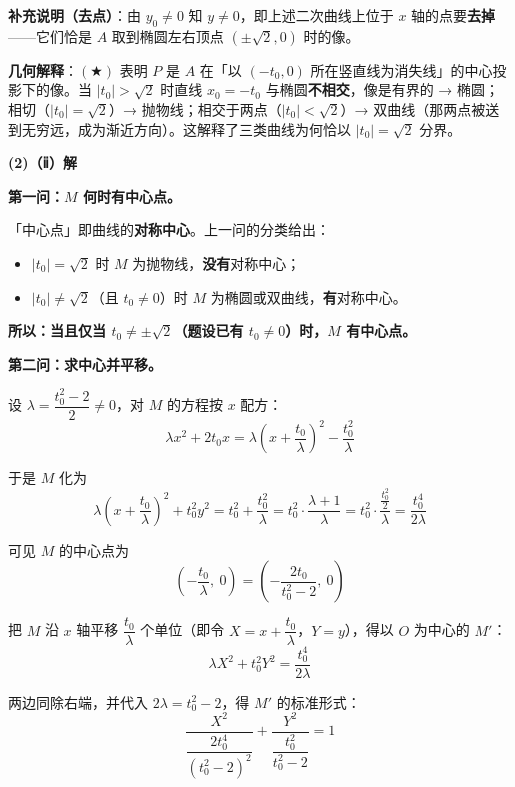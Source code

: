 \begin{answer}
\textbf{补充说明（去点）}：由 $y_0\ne0$ 知 $y\ne0$，即上述二次曲线上位于 $x$ 轴的点要\textbf{去掉}——它们恰是 $A$ 取到椭圆左右顶点 $\left(\pm\sqrt2,0\right)$ 时的像。

\begin{gktip}
\textbf{几何解释}：$(\bigstar)$ 表明 $P$ 是 $A$ 在「以 $\left(-t_0,0\right)$ 所在竖直线为消失线」的中心投影下的像。当 $\left|t_0\right|>\sqrt2$ 时直线 $x_0=-t_0$ 与椭圆\textbf{不相交}，像是有界的 → 椭圆；相切（$\left|t_0\right|=\sqrt2$）→ 抛物线；相交于两点（$\left|t_0\right|<\sqrt2$）→ 双曲线（那两点被送到无穷远，成为渐近方向）。这解释了三类曲线为何恰以 $\left|t_0\right|=\sqrt2$ 分界。
\end{gktip}

\par\medskip

\textbf{(2)（ⅱ）解}

\textbf{第一问：$M$ 何时有中心点。}

「中心点」即曲线的\textbf{对称中心}。上一问的分类给出：
\begin{itemize}
\item $\left|t_0\right|=\sqrt2$ 时 $M$ 为抛物线，\textbf{没有}对称中心；
\item $\left|t_0\right|\ne\sqrt2$（且 $t_0\ne0$）时 $M$ 为椭圆或双曲线，\textbf{有}对称中心。
\end{itemize}

\textbf{所以：当且仅当 $t_0\ne\pm\sqrt2$（题设已有 $t_0\ne0$）时，$M$ 有中心点。}

\textbf{第二问：求中心并平移。}

设 $\lambda=\dfrac{t_0^2-2}{2}\ne0$，对 $M$ 的方程按 $x$ 配方：
\nopagebreak[4]
\[\lambda x^2+2t_0x=\lambda\left(x+\frac{t_0}{\lambda}\right)^2-\frac{t_0^2}{\lambda}\]

于是 $M$ 化为
\nopagebreak[4]
\[\lambda\left(x+\frac{t_0}{\lambda}\right)^2+t_0^2y^2=t_0^2+\frac{t_0^2}{\lambda}=t_0^2\cdot\frac{\lambda+1}{\lambda}=t_0^2\cdot\frac{\frac{t_0^2}{2}}{\lambda}=\frac{t_0^4}{2\lambda}\]

可见 $M$ 的中心点为
\nopagebreak[4]
\[\left(-\frac{t_0}{\lambda},\ 0\right)=\left(-\frac{2t_0}{t_0^2-2},\ 0\right)\]

把 $M$ 沿 $x$ 轴平移 $\dfrac{t_0}{\lambda}$ 个单位（即令 $X=x+\dfrac{t_0}{\lambda}$，$Y=y$），得以 $O$ 为中心的 $M'$：
\nopagebreak[4]
\[\lambda X^2+t_0^2Y^2=\frac{t_0^4}{2\lambda}\]

两边同除右端，并代入 $2\lambda=t_0^2-2$，得 $M'$ 的标准形式：
\nopagebreak[4]
\[\boxed{\frac{X^2}{\dfrac{2t_0^4}{\left(t_0^2-2\right)^2}}+\frac{Y^2}{\dfrac{t_0^2}{t_0^2-2}}=1}\]


\end{answer}
